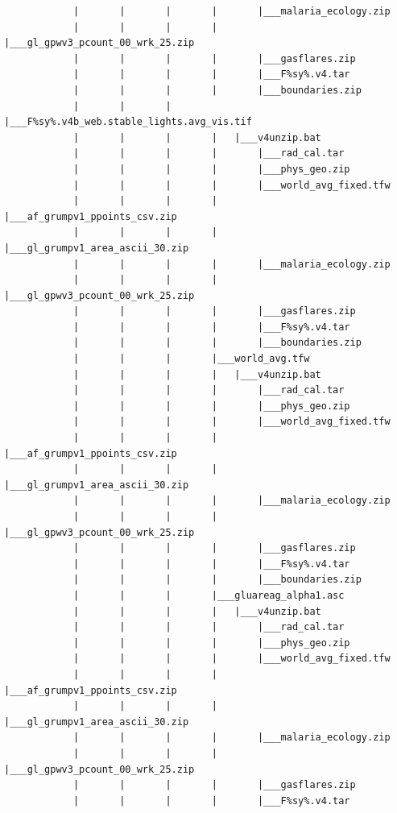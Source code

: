 \documentclass[]{book}
\begin{document}
\begin{verbatim}
            |       |       |       |       |___malaria_ecology.zip
            |       |       |       |       |___gl_gpwv3_pcount_00_wrk_25.zip
            |       |       |       |       |___gasflares.zip
            |       |       |       |       |___F%sy%.v4.tar
            |       |       |       |       |___boundaries.zip
            |       |       |       |___F%sy%.v4b_web.stable_lights.avg_vis.tif
            |       |       |       |   |___v4unzip.bat
            |       |       |       |       |___rad_cal.tar
            |       |       |       |       |___phys_geo.zip
            |       |       |       |       |___world_avg_fixed.tfw
            |       |       |       |       |___af_grumpv1_ppoints_csv.zip
            |       |       |       |       |___gl_grumpv1_area_ascii_30.zip
            |       |       |       |       |___malaria_ecology.zip
            |       |       |       |       |___gl_gpwv3_pcount_00_wrk_25.zip
            |       |       |       |       |___gasflares.zip
            |       |       |       |       |___F%sy%.v4.tar
            |       |       |       |       |___boundaries.zip
            |       |       |       |___world_avg.tfw
            |       |       |       |   |___v4unzip.bat
            |       |       |       |       |___rad_cal.tar
            |       |       |       |       |___phys_geo.zip
            |       |       |       |       |___world_avg_fixed.tfw
            |       |       |       |       |___af_grumpv1_ppoints_csv.zip
            |       |       |       |       |___gl_grumpv1_area_ascii_30.zip
            |       |       |       |       |___malaria_ecology.zip
            |       |       |       |       |___gl_gpwv3_pcount_00_wrk_25.zip
            |       |       |       |       |___gasflares.zip
            |       |       |       |       |___F%sy%.v4.tar
            |       |       |       |       |___boundaries.zip
            |       |       |       |___gluareag_alpha1.asc
            |       |       |       |   |___v4unzip.bat
            |       |       |       |       |___rad_cal.tar
            |       |       |       |       |___phys_geo.zip
            |       |       |       |       |___world_avg_fixed.tfw
            |       |       |       |       |___af_grumpv1_ppoints_csv.zip
            |       |       |       |       |___gl_grumpv1_area_ascii_30.zip
            |       |       |       |       |___malaria_ecology.zip
            |       |       |       |       |___gl_gpwv3_pcount_00_wrk_25.zip
            |       |       |       |       |___gasflares.zip
            |       |       |       |       |___F%sy%.v4.tar

\end{verbatim}
\end{document}
